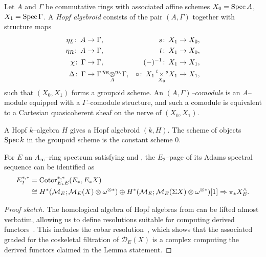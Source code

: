 \begin{definition}\label{FHGivesComodules}
Let $A$ and $\Gamma$ be commutative rings with associated affine schemes $X_0 = \operatorname{Spec} A$, $X_1 = \operatorname{Spec} \Gamma$.  A \textit{Hopf algebroid} consists of the pair $(A, \Gamma)$ together with structure maps
\begin{align*}
\eta_L \co A & \to \Gamma, & s\co X_1 & \to X_0, \\
\eta_R \co A & \to \Gamma, & t\co X_1 & \to X_0, \\
\chi \co \Gamma & \to \Gamma, & (-)^{-1}\co X_1 & \to X_1, \\
\Delta \co \Gamma & \to \Gamma \presuper{\eta_R}{\underset{A}\otimes}^{\eta_L} \Gamma, & \circ\co X_1 \presuper{t}{\underset{X_0}{\times}}^{s} X_1 & \to X_1,
\end{align*}
such that $(X_0, X_1)$ forms a groupoid scheme.  An \textit{$(A, \Gamma)$--comodule} is an $A$--module equipped with a $\Gamma$--comodule structure, and such a comodule is equivalent to a Cartesian quasicoherent sheaf on the nerve of $(X_0, X_1)$.
\end{definition}

\begin{example}
A Hopf $k$--algebra $H$ gives a Hopf algebroid $(k, H)$.  The scheme of objects $\operatorname{Spec} k$ in the groupoid scheme is the constant scheme $0$.
\end{example}

\begin{lemma}\label{IdentifyingAdamsE2Page}
For $E$ an $A_\infty$--ring spectrum satisfying {\CH} and {\FH}, the $E_2$--page of its Adams spectral sequence can be identified as
\begin{align*}
E_2^{*, *} & = \operatorname{Cotor}_{E_* E}^{*, *}(E_*, E_* X) \\
& \cong H^*(\mathcal{M}_{E}; \mathcal{M}_{E}(X) \otimes \omega^{\otimes *}) \oplus H^*(\mathcal{M}_{E}; \mathcal{M}_{E}(\Sigma X) \otimes \omega^{\otimes *})[1] \Rightarrow \pi_* X^\wedge_E.
\end{align*}
\end{lemma}
\begin{proof}[Proof sketch]
The homological algebra of Hopf algebras from  can be lifted almost verbatim, allowing us to define resolutions suitable for computing derived functors~\cite[Definition A1.2.3]{RavenelGreenBook}.  This includes the cobar resolution~\cite[Definition A1.2.11]{RavenelGreenBook}, which shows that the associated graded for the coskeletal filtration of $\mathcal D_E(X)$ is a complex computing the derived functors claimed in the Lemma statement.
\end{proof}

